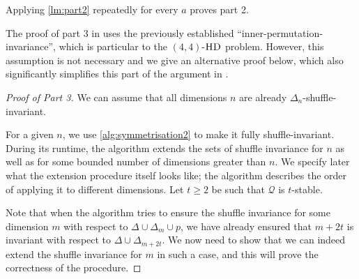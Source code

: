 \documentclass{article}
\begin{document}
Applying \cref{lm:part2} repeatedly for every $a$ proves part 2.

\medskip

The proof of part 3 in \cite{FGHH25} uses the previously established ``inner-permutation-invariance'', which is particular to the $(4,4)$-$\operatorname{\textsc{HD}}$ problem. However, this assumption is not necessary and we give an alternative proof below, which also significantly simplifies this part of the argument in \cite{FGHH25}.


\begin{proof}[Proof of Part 3]
    We can assume that all dimensions $n$ are already $\Delta_n$-shuffle-invariant. 
    
    For a given $n$, we use \cref{alg:symmetrisation2} to make it fully shuffle-invariant. During its runtime, the algorithm extends the sets of shuffle invariance for $n$ as well as for some bounded number of dimensions greater than $n$. We specify later what the extension procedure itself looks like; the algorithm describes the order of applying it to different dimensions. Let $t\geq 2$ be such that $\mathcal{Q}$ is $t$-stable.

    \begin{algorithm}
        \begin{algorithmic}
            \State {$\Delta = \varnothing$}
                \EndFor
            \EndFor
        \end{algorithmic}
        \caption{Symmetrisation procedure}
        \label{alg:symmetrisation2}
    \end{algorithm}

    Note that when the algorithm tries to ensure the shuffle invariance for some dimension $m$ with respect to $\Delta \cup \Delta_m \cup p$, we have already ensured that $m + 2t$ is invariant with respect to $\Delta \cup \Delta_{m + 2t}$. We now need to show that we can indeed extend the shuffle invariance for $m$ in such a case, and this will prove the correctness of the procedure.


\end{proof}
\end{document}

